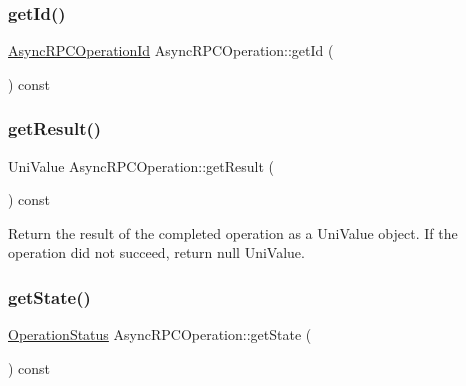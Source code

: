 \mbox{\label{class_async_r_p_c_operation_ab146889334b2c769abcae4227e51935a}} 
\subsubsection{\texorpdfstring{get\+Id()}{getId()}}
{\footnotesize\ttfamily \mbox{\hyperlink{asyncrpcoperation_8h_a1fb3337bad8503e6f6823aa1bcd7191c}{Async\+R\+P\+C\+Operation\+Id}} Async\+R\+P\+C\+Operation\+::get\+Id (\begin{DoxyParamCaption}{ }\end{DoxyParamCaption}) const\hspace{0.3cm}{\ttfamily [inline]}}

\mbox{\label{class_async_r_p_c_operation_a9d55ed3338361eb7cec39c1a09dd7302}} 
\subsubsection{\texorpdfstring{get\+Result()}{getResult()}}
{\footnotesize\ttfamily Uni\+Value Async\+R\+P\+C\+Operation\+::get\+Result (\begin{DoxyParamCaption}{ }\end{DoxyParamCaption}) const}

Return the result of the completed operation as a Uni\+Value object. If the operation did not succeed, return null Uni\+Value. \mbox{\label{class_async_r_p_c_operation_a5dc5eb2a358d01926b7c5c4f6cf29b3e}} 
\subsubsection{\texorpdfstring{get\+State()}{getState()}}
{\footnotesize\ttfamily \mbox{\hyperlink{asyncrpcoperation_8h_ac36eba6558c325a3ae9853d551326ff6}{Operation\+Status}} Async\+R\+P\+C\+Operation\+::get\+State (\begin{DoxyParamCaption}{ }\end{DoxyParamCaption}) const\hspace{0.3cm}{\ttfamily [inline]}}

